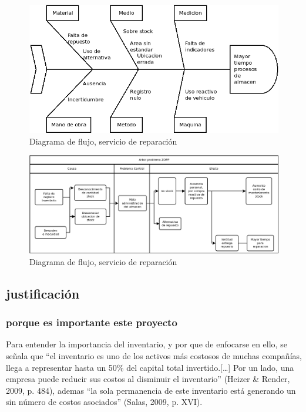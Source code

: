 \documentclass[a4papper,11pt]{article}
\begin{document}
        \begin{figure}[!ht]
        \centering
        \vspace{-20pt}
        \includegraphics[width=\textwidth]{ishikawa.png}
        \vspace{-20pt}
        \caption{Diagrama de flujo, servicio de reparación}
        \label{ishikawa}
      \end{figure}


      \begin{figure}[!ht]
      \centering
      \vspace{-20pt}
      \includegraphics[width=\textwidth]{Arbol_problema_ZOPP.png}
      \vspace{-20pt}
      \caption{Diagrama de flujo, servicio de reparación}
      \label{ZOPP}
      \end{figure}

    \subsection{justificación}

    \subsubsection{porque es importante este proyecto}
      Para entender la importancia del inventario, y por que de enfocarse en ello, se señala que “el inventario es uno de los activos más costosos de muchas compañías, llega a representar hasta un 50\% del capital total invertido.[…] Por un lado, una empresa puede reducir sus costos al disminuir el inventario” (Heizer & Render, 2009, p. 484), ademas “la sola permanencia de este inventario está generando un sin número de costos asociados” (Salas, 2009, p. XVI).
\end{document}
